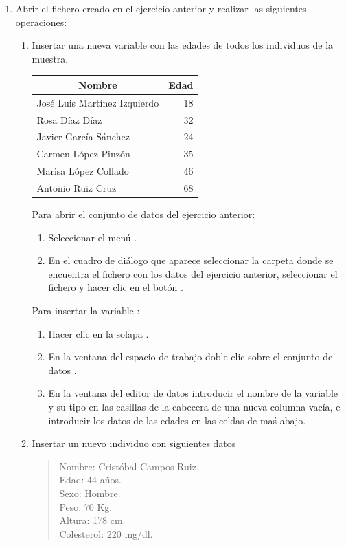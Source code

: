 \begin{enumerate}[leftmargin=*]
\item Abrir el fichero creado en el ejercicio anterior y realizar las siguientes operaciones:

\begin{enumerate}
\item Insertar una nueva variable  con las edades de todos los individuos de la muestra.
\begin{center}
\begin{tabular}{|l|r|}
\hline
\multicolumn{1}{|c|}{Nombre} & \multicolumn{1}{c|}{Edad} \\
\hline
José Luis Martínez Izquierdo & 18 \\
Rosa Díaz Díaz & 32 \\
Javier García Sánchez & 24 \\
Carmen López Pinzón & 35 \\
Marisa López Collado & 46 \\
Antonio Ruiz Cruz & 68 \\
\hline
\end{tabular}
\end{center}

\begin{indicacion} 
Para abrir el conjunto de datos del ejercicio anterior:
\begin{enumerate}
\item Seleccionar el menú .
\item En el cuadro de diálogo que aparece seleccionar la carpeta donde se encuentra el fichero con los datos del ejercicio anterior,
seleccionar el fichero y hacer clic en el botón .
\end{enumerate}
Para insertar la variable :
\begin{enumerate}
\item Hacer clic en la solapa .
\item En la ventana del espacio de trabajo doble clic sobre el conjunto de datos .
\item En la ventana del editor de datos introducir el nombre de la variable  y su tipo en las casillas de la cabecera de una nueva columna vacía, e introducir los datos de las edades en las celdas de maś abajo. 
\end{enumerate}
\end{indicacion}

\item Insertar un nuevo individuo con siguientes datos
\begin{quote}
Nombre: Cristóbal Campos Ruiz.\\
Edad: 44 años.\\
Sexo: Hombre.\\
Peso: 70 Kg.\\
Altura: 178 cm.\\
Colesterol: 220 mg/dl.
\end{quote}


\end{enumerate}
\end{enumerate}
